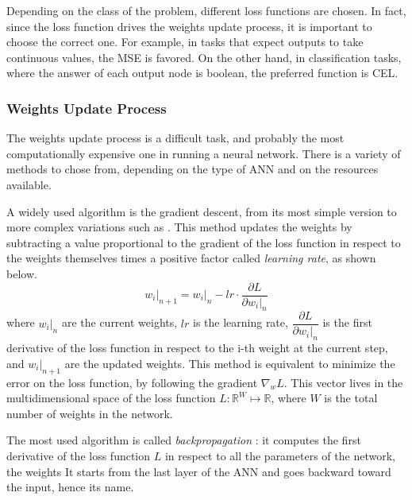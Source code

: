 
Depending on the class of the problem, different loss functions are chosen.
In fact, since the loss function drives the weights update process, it is important to choose the correct one.
For example, in tasks that expect outputs to take continuous values, the \acs{MSE} is favored.
On the other hand, in classification tasks, where the answer of each output node is boolean, the preferred function is \acs{CEL}.

\subsubsection{Weights Update Process}
\label{sssec:Weights_Update_Process}

The weights update process is a difficult task, and probably the most computationally expensive one in running a neural network.
There is a variety of methods to chose from, depending on the type of \acs{ANN} and on the resources available.

A widely used algorithm is the gradient descent, from its most simple version to more complex variations such as .
This method updates the weights by subtracting a value proportional to the gradient of the loss function in respect to the weights themselves times a positive factor called \textit{learning rate}, as shown below.
\begin{equation}
	\left.w_i\right|_{n+1} = \left.w_i\right|_n - lr \cdot \frac{\partial L}{\partial \left.w_i\right|_n}
\end{equation}
where $\left.w_i\right|_{n}$ are the current weights, $lr$ is the learning rate, $\dfrac{\partial L}{\partial \left.w_i\right|_n}$ is the first derivative of the loss function in respect to the i-th weight at the current step, and $\left.w_i\right|_{n+1}$ are the updated weights.
This method is equivalent to minimize the error on the loss function, by following the gradient $\nabla_w L$.
This vector lives in the multidimensional space of the loss function $L:\mathbb{R}^W \mapsto \mathbb{R}$, where $W$ is the total number of weights in the network.

The most used algorithm is called \textit{backpropagation}
: it computes the first derivative of the loss function $L$ in respect to all the parameters of the network, the weights
It starts from the last layer of the \acs{ANN} and goes backward toward the input, hence its name.

